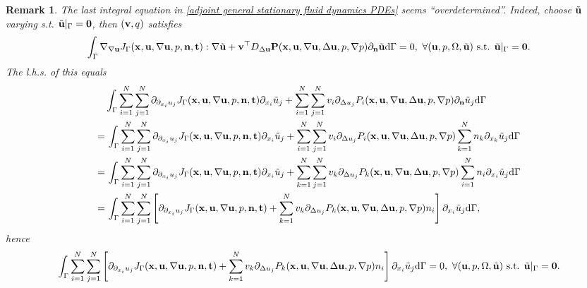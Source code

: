 \documentclass[oneside]{book}
\numberwithin{equation}{section}
\newtheorem{remark}{Remark}[section]
\begin{document}
\begin{itemize}[leftmargin=0in]
    \begin{remark}
        The last integral equation in \eqref{adjoint general stationary fluid dynamics PDEs} seems ``overdetermined''. Indeed, choose $\tilde{\bf u}$ varying s.t. $\tilde{\bf u}|_\Gamma = {\bf 0}$, then $({\bf v},q)$ satisfies
        \begin{align*}
            \int_\Gamma \nabla_{\nabla{\bf u}}J_\Gamma({\bf x},{\bf u},\nabla{\bf u},p,{\bf n},{\bf t}):\nabla\tilde{\bf u} + {\bf v}^\top D_{\Delta{\bf u}}{\bf P}({\bf x},{\bf u},\nabla{\bf u},\Delta{\bf u},p,\nabla p)\partial_{\bf n}\tilde{\bf u}{\rm d}\Gamma = 0,\ \forall({\bf u},p,\Omega,\tilde{\bf u}) \mbox{ s.t. } \tilde{\bf u}|_\Gamma = {\bf 0}.
        \end{align*}
        The l.h.s. of this equals
        \begin{align*}
            &\int_\Gamma \sum_{i=1}^N\sum_{j=1}^N \partial_{\partial_{x_i}u_j}J_\Gamma({\bf x},{\bf u},\nabla{\bf u},p,{\bf n},{\bf t})\partial_{x_i}\tilde{u}_j + \sum_{i=1}^N\sum_{j=1}^N v_i\partial_{\Delta u_j}P_i({\bf x},{\bf u},\nabla{\bf u},\Delta{\bf u},p,\nabla p)\partial_{\bf n}\tilde{u}_j{\rm d}\Gamma\\
            =&\, \int_\Gamma \sum_{i=1}^N\sum_{j=1}^N \partial_{\partial_{x_i}u_j}J_\Gamma({\bf x},{\bf u},\nabla{\bf u},p,{\bf n},{\bf t})\partial_{x_i}\tilde{u}_j + \sum_{i=1}^N\sum_{j=1}^N v_i\partial_{\Delta u_j}P_i({\bf x},{\bf u},\nabla{\bf u},\Delta{\bf u},p,\nabla p)\sum_{k=1}^N n_k\partial_{x_k}\tilde{u}_j{\rm d}\Gamma\\
            =&\, \int_\Gamma \sum_{i=1}^N\sum_{j=1}^N \partial_{\partial_{x_i}u_j}J_\Gamma({\bf x},{\bf u},\nabla{\bf u},p,{\bf n},{\bf t})\partial_{x_i}\tilde{u}_j + \sum_{k=1}^N\sum_{j=1}^N v_k\partial_{\Delta u_j}P_k({\bf x},{\bf u},\nabla{\bf u},\Delta{\bf u},p,\nabla p)\sum_{i=1}^N n_i\partial_{x_i}\tilde{u}_j{\rm d}\Gamma\\
            =&\, \int_\Gamma \sum_{i=1}^N\sum_{j=1}^N \left[\partial_{\partial_{x_i}u_j}J_\Gamma({\bf x},{\bf u},\nabla{\bf u},p,{\bf n},{\bf t}) + \sum_{k=1}^N v_k\partial_{\Delta u_j}P_k({\bf x},{\bf u},\nabla{\bf u},\Delta{\bf u},p,\nabla p)n_i\right]\partial_{x_i}\tilde{u}_j{\rm d}\Gamma,
        \end{align*}
        hence
        \begin{align*}
            \int_\Gamma \sum_{i=1}^N\sum_{j=1}^N \left[\partial_{\partial_{x_i}u_j}J_\Gamma({\bf x},{\bf u},\nabla{\bf u},p,{\bf n},{\bf t}) + \sum_{k=1}^N v_k\partial_{\Delta u_j}P_k({\bf x},{\bf u},\nabla{\bf u},\Delta{\bf u},p,\nabla p)n_i\right]\partial_{x_i}\tilde{u}_j{\rm d}\Gamma = 0,\ \forall({\bf u},p,\Omega,\tilde{\bf u}) \mbox{ s.t. } \tilde{\bf u}|_\Gamma = {\bf 0}.

\end{align*}
\end{remark}
\end{itemize}
\end{document}
